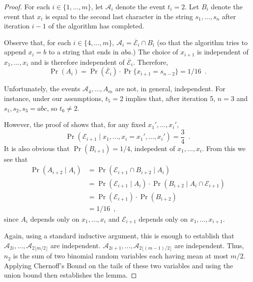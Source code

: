 \documentclass{patmorin}
\newcommand{\floor}[1]{\lfloor #1\rfloor}
\begin{document}
\begin{proof}
  For each $i\in\{1,\ldots,m\}$, let $\mathcal{A}_i$ denote the event $t_{i}=2$.  Let $B_i$ denote the event that $x_i$ is equal to the second last character in the string $s_1,\ldots,s_n$ after iteration $i-1$ of the algorithm has completed.
  
  Observe that, for each $i\in\{4,\ldots,m\}$, $\mathcal{A}_i=\overline{\mathcal{E}}_i\cap B_i$ (so that the algorithm tries to append $x_i=b$ to a string that ends in $aba$.) The choice of $x_{i+1}$ is independent of $x_1,\ldots,x_{i}$ and is therefore independent of $\overline{\mathcal{E}}_i$.  Therefore,
  \[  \Pr(A_i) = \Pr(\overline{\mathcal{E}}_i)\cdot\Pr\{x_{i+1}=s_{n-2}\} = 1/16 \enspace .
  \]
  
  Unfortunately, the events $\mathcal{A}_4,\ldots,A_m$ are not, in general, independent.  For instance, under our assumptions, $t_5=2$ implies that, after iteration 5, $n=3$ and $s_1,s_2,s_3=abc$, so $t_6\neq 2$.
  
  However, the proof of  shows that, for any fixed $x_1',\ldots,x_i'$,
  \[
     \Pr(\mathcal{E}_{i+1}\mid x_1,\ldots,x_i=x_1',\ldots,x_i') = \frac{3}{4} \enspace .
  \]
  It is also obvious that $\Pr(B_{i+1})=1/4$, indepedent of $x_1,\ldots,x_i$.  From this we see that
  \begin{align*}
     \Pr(A_{i+2}\mid A_i) 
     & = \Pr(\mathcal{E}_{i+1}\cap B_{i+2}\mid A_i) \\
     & = \Pr(\mathcal{E}_{i+1}\mid A_i)\cdot \Pr(B_{i+2}\mid A_i\cap\mathcal{E}_{i+1}) \\
     & = \Pr(\mathcal{E}_{i+1})\cdot \Pr(B_{i+2}) \\
     & = 1/16 \enspace ,
  \end{align*}
  since $A_i$ depends only on $x_1,\ldots,x_i$ and $\mathcal{E}_{i+1}$ depends only on $x_{1},\ldots,x_{i+1}$.
  
  Again, using a standard inductive argument, this is enough to establish that $\mathcal{A}_{2i},\ldots,\mathcal{A}_{2\floor{m/2}}$ are independent.
  $\mathcal{A}_{2i+1},\ldots,\mathcal{A}_{2\floor{(m-1)/2}}$ are independent.  Thus, $n_2$ is the sum of two binomial random variables each having mean at most $m/2$.  Applying Chernoff's Bound on the tails of these two variables and using the union bound then establishes the lemma.
\end{proof}
\end{document}
